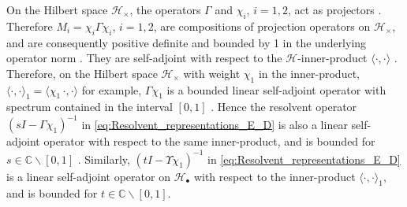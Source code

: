 \documentclass{cmslatex}
\begin{document}
On the Hilbert space $\mathscr{H}_\times$, the operators $\Gamma$ and $\chi_i$,
$i=1,2$, act as projectors \cite{Golden:CMP-473}. Therefore 
$M_i=\chi_i\Gamma\chi_i$, $i=1,2$, are compositions of projection operators on
$\mathscr{H}_\times$, and are consequently positive definite and bounded by
1 in the underlying operator norm \cite{Rudin:87}. They are
self-adjoint with respect to the $\mathscr{H}$-inner-product $\langle\cdot,\cdot\rangle$
\cite{Golden:CMP-473}. Therefore, on the Hilbert space $\mathscr{H}_\times$
with weight $\chi_1$ in the inner-product, $\langle\cdot,\cdot\rangle_1=\langle\chi_1\,\cdot,\cdot\rangle$ for
example, $\Gamma\chi_1$ is a bounded linear self-adjoint operator with
spectrum contained in the interval $[0,1]$
\cite{Golden:CMP-473,Folland:95,Rudin:87}. Hence the resolvent
operator $(sI-\Gamma\chi_1)^{-1}$ in \eqref{eq:Resolvent_representations_E_D}
is also a linear self-adjoint operator with respect to the same
inner-product, and is bounded for  $s\in\mathbb{C}\backslash[0,1]$
\cite{Stone:64}. Similarly, $(tI-\Upsilon\chi_1)^{-1}$ in
\eqref{eq:Resolvent_representations_E_D} is a linear self-adjoint
operator on $\mathscr{H}_\bullet$ with respect to the inner-product
$\langle\cdot,\cdot\rangle_1$, and is bounded for $t\in\mathbb{C}\backslash[0,1]$.
\end{document}
